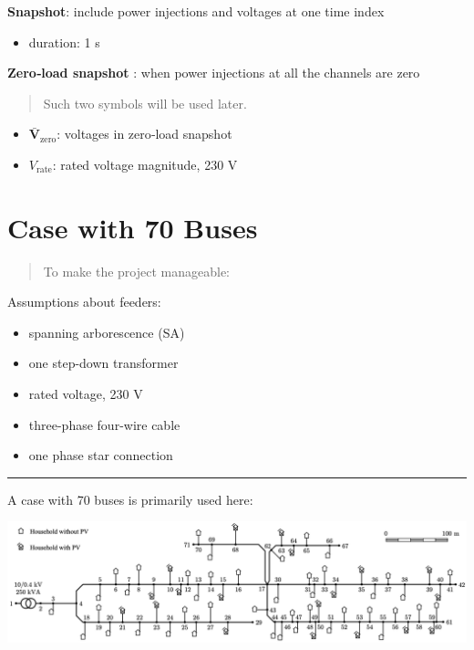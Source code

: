 \documentclass[
]{book}
\providecommand{\tightlist}{%
  \setlength{\itemsep}{0pt}\setlength{\parskip}{0pt}}
\begin{document}
\textbf{Snapshot}: include power injections and voltages at one time index

\begin{itemize}
\tightlist
\item
  duration: 1 s
\end{itemize}

\textbf{Zero‐load snapshot} : when power injections at all the channels are zero

\begin{quote}
Such two symbols will be used later.
\end{quote}

\begin{itemize}
\tightlist
\item
  \(\boldsymbol{\bar{V}}_\text{zero}\): voltages in zero‐load snapshot
\item
  \(V_\text{rate}\): rated voltage magnitude, 230 V
\end{itemize}

\hypertarget{case}{%
\section{Case with 70 Buses}\label{case}}

\begin{quote}
To make the project manageable:
\end{quote}

Assumptions about feeders:

\begin{itemize}
\tightlist
\item
  spanning arborescence (SA)
\item
  one step-down transformer
\item
  rated voltage, 230 V
\item
  three-phase four-wire cable
\item
  one phase star connection
\end{itemize}

\begin{center}\rule{0.5\linewidth}{0.5pt}\end{center}

A case with 70 buses is primarily used here:

\includegraphics{Pictures/case70true.png}
\end{document}
